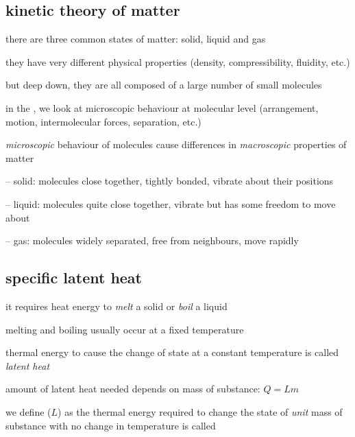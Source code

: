 \subsection{kinetic theory of matter}

there are three common states of matter: solid, liquid and gas

they have very different physical properties (density, compressibility, fluidity, etc.)

but deep down, they are all composed of a large number of small molecules

in the , we look at microscopic behaviour at molecular level (arrangement, motion, intermolecular forces, separation, etc.)

\emph{microscopic} behaviour of molecules cause differences in \emph{macroscopic} properties of matter

\begin{compactitem}
	\item[--] solid: molecules close together, tightly bonded, vibrate about their positions
	
	\item[--] liquid: molecules quite close together, vibrate but has some freedom to move about
	
	\item[--] gas: molecules widely separated, free from neighbours, move rapidly
\end{compactitem}

\subsection{specific latent heat}

it requires heat energy to \emph{melt} a solid or \emph{boil} a liquid

melting and boiling usually occur at a fixed temperature

thermal energy to cause the change of state at a constant temperature is called \emph{latent heat}

amount of latent heat needed depends on mass of substance: $\boxed{Q=Lm}$

\begin{ilight}
	we define  ($L$) as the thermal energy required to change the state of \emph{unit} mass of substance with no change in temperature is called 
\end{ilight}



